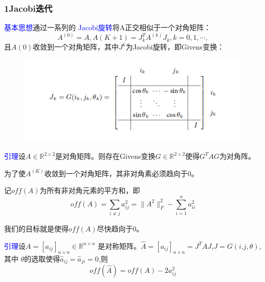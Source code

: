 \documentclass[notheorems,serif]{beamer}
\begin{document}
\begin{frame}
\frametitle{1\qquad Jacobi迭代}

\textcolor{blue}{基本思想}\quad 通过一系列的 \textcolor{blue}{Jacobi旋转}将A正交相似于一个对角矩阵：
$$A^{(0)}=A,A{(K+1)}=J_k^TA^{(k)}J_k,k=0,1,\cdots,$$
且$A{(0)}$收敛到一个对角矩阵，其中$J^k$为Jacobi旋转，即Givens变换：

\begin{figure}[H]
	\centering
	\includegraphics[scale=0.7]{figures/5-1.png}
\end{figure}
\end{frame}
\begin{frame}
\textcolor{blue}{引理}\quad 设$A\in\mathbb{R}^{2\times 2}$是对角矩阵。则存在Givens变换$G\in \mathbb{R}^{2\times 2}$使得$G^TAG$为对角阵。
\end{frame}
\begin{frame}
为了使$A^{(K)}$收敛到一个对角矩阵，其非对角素必须趋向于0。

记$off(A)$为所有非对角元素的平方和，即
$$off(A)=\sum_{i\neq j}a_{ij}^2=\|A^2\|_F^2-\sum_{i=1}^na_{ii}^2$$

我们的目标就是使得$off(A)$尽快趋向于0。

\textcolor{blue}{引理}\quad 设$A=[a_{ij}]_{n\times n}\in \mathbb{R}^{n\times n}$
是对称矩阵。$\widehat{A}=[a_{ij}]_{n\times n}=J^TAJ$,$J=G(i.j,\theta)$,其中
$\theta$的选取使得$\widehat a_{ij}=\widehat a_{ji}=0$,则$$off(\widehat
A)=off(A)-2a_{ij}^2$$
\end{frame}
\end{document}
